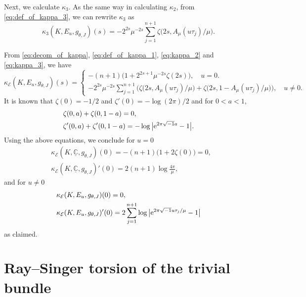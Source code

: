 \documentclass[pdftex]{sigma}
\numberwithin{equation}{section}
\newcommand{\ii}{\sqrt{-1}}
\newcommand{\RN}{\cE}
\newcommand{\bC}{\mathbb{C}}
\newcommand{\cE}{\mathcal{E}}
\begin{document}
Next, we calculate $\kappa_{3}$.
As the same way in calculating $\kappa_{2}$,
from \eqref{eq:def_of_kappa_3},
we can rewrite $\kappa_{3}$ as
\begin{equation}
 \kappa_{3} ( K, E_{u} , g_{\theta , J} ) (s)
 =
 -
 2^{2s} \mu^{-2s}
 \sum_{j=1}^{n+1}
 \zeta \bigl( 2s , A_{\mu} ( u {\tau}_j) / \mu \bigr)
 .
 \label{eq:kappa_3}
\end{equation}

From \eqref{eq:decom_of_kappa}, \eqref{eq:def_of_kappa_1}, \eqref{eq:kappa_2} and \eqref{eq:kappa_3},
we have
\[
 \kappa_{\RN} ( K, E_{u} , g_{\theta , J} ) (s)
 =
 \begin{cases}
 \displaystyle
 -(n+1)
 \bigl( 1+
 2^{2s+1}
 \mu^{-2s}
 \zeta (2s)
 \bigr)
 ,
 \quad
 u = 0 .
 \\
 \displaystyle
 -
 2^{2s} \mu^{-2s}
 \sum_{j=1}^{n+1}
 \big(
 \zeta \bigl( 2s , A_{\mu} (u {\tau}_j) / \mu \bigr)
 +
 \zeta \bigl( 2s , 1 - A_{\mu} (u {\tau}_j) / \mu \bigr)
 \big)
 ,
 \quad
 u \not = 0 .
 \end{cases}
\]
It is known that
$\zeta (0) = -1/2$ and $\zeta ' (0) = - \log (2 \pi)/2$
and for $0 < a < 1$,
\begin{align*}
& \zeta (0 ,a) + \zeta (0 , 1-a)
 = 0 , \\
& \zeta ' (0 ,a) + \zeta ' (0 , 1-a)
 = - \log \big| {\rm e}^{2 \pi \ii a} -1 \big|
 .
\end{align*}
Using the above equations,
we conclude
for $u = 0$
\begin{align*}
& \kappa_{\RN} (K, \underline{\bC} , g_{\theta , J} ) (0)
 =
 - (n+1) \bigl( 1 + 2 \zeta (0) \bigl) = 0
 ,
 \\
& \kappa_{\RN} (K, \underline{\bC} , g_{\theta , J} ) ' (0)
 =
 2 (n+1) \log \frac{4 \pi}{\mu}
 ,
\end{align*}
and
for $u \not = 0$
\begin{align*}
& \kappa_\RN (K, E_{u} , g_{\theta , J} ) (0)
 = 0
 ,
 \\
& \kappa_\RN (K, E_{u} , g_{\theta , J} ) ' (0)
 =
 2 \sum_{j=1}^{n+1} \log \big| {\rm e}^{ 2 \pi \ii u {\tau}_j / \mu } -1 \big|
\end{align*}
as claimed.



\section{Ray--Singer torsion of the trivial bundle}
\label{sec:Ray--Singer_torsion_on_the_trivial_vector_bundle}
\end{document}
